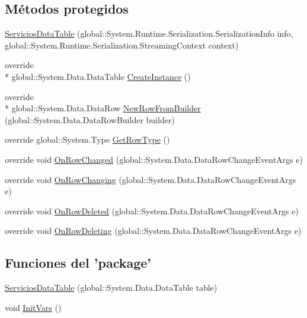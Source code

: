 \subsection*{Métodos protegidos}
\begin{DoxyCompactItemize}
\item 
\hyperlink{class_proyecto___integrador__3_1_1ds_servicios_1_1_servicios_data_table_a61948734b917b9601a8c4ba89f257ce1}{Servicios\-Data\-Table} (global\-::\-System.\-Runtime.\-Serialization.\-Serialization\-Info info, global\-::\-System.\-Runtime.\-Serialization.\-Streaming\-Context context)
\item 
override \\*
global\-::\-System.\-Data.\-Data\-Table \hyperlink{class_proyecto___integrador__3_1_1ds_servicios_1_1_servicios_data_table_afa9306495769d23b1be81ff0930b45ac}{Create\-Instance} ()
\item 
override \\*
global\-::\-System.\-Data.\-Data\-Row \hyperlink{class_proyecto___integrador__3_1_1ds_servicios_1_1_servicios_data_table_a06a0bad0e3c2d30b1aa95d1ddac34770}{New\-Row\-From\-Builder} (global\-::\-System.\-Data.\-Data\-Row\-Builder builder)
\item 
override global\-::\-System.\-Type \hyperlink{class_proyecto___integrador__3_1_1ds_servicios_1_1_servicios_data_table_aae64e60a790da46a32dd554e53396030}{Get\-Row\-Type} ()
\item 
override void \hyperlink{class_proyecto___integrador__3_1_1ds_servicios_1_1_servicios_data_table_adc98ef75ef60983145f5b52e5e80a23a}{On\-Row\-Changed} (global\-::\-System.\-Data.\-Data\-Row\-Change\-Event\-Args e)
\item 
override void \hyperlink{class_proyecto___integrador__3_1_1ds_servicios_1_1_servicios_data_table_ab00bb6b8cb1debbe995bfced0135b57c}{On\-Row\-Changing} (global\-::\-System.\-Data.\-Data\-Row\-Change\-Event\-Args e)
\item 
override void \hyperlink{class_proyecto___integrador__3_1_1ds_servicios_1_1_servicios_data_table_a4ed7e2ef073e09442707667d741ade90}{On\-Row\-Deleted} (global\-::\-System.\-Data.\-Data\-Row\-Change\-Event\-Args e)
\item 
override void \hyperlink{class_proyecto___integrador__3_1_1ds_servicios_1_1_servicios_data_table_ad06d230daed647e51aaf757b7429127f}{On\-Row\-Deleting} (global\-::\-System.\-Data.\-Data\-Row\-Change\-Event\-Args e)
\end{DoxyCompactItemize}
\subsection*{Funciones del 'package'}
\begin{DoxyCompactItemize}
\item 
\hyperlink{class_proyecto___integrador__3_1_1ds_servicios_1_1_servicios_data_table_a3b5fd9102d3638f916385c186a16d6b4}{Servicios\-Data\-Table} (global\-::\-System.\-Data.\-Data\-Table table)
\item 
void \hyperlink{class_proyecto___integrador__3_1_1ds_servicios_1_1_servicios_data_table_a96f02be0920a068ba412f0eb22ddeae6}{Init\-Vars} ()
\end{DoxyCompactItemize}

